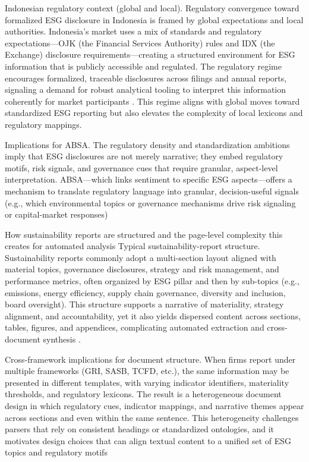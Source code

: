 Indonesian regulatory context (global and local). Regulatory convergence toward formalized ESG disclosure in Indonesia is framed by global expectations and local authorities. Indonesia’s market uses a mix of standards and regulatory expectations—OJK (the Financial Services Authority) rules and IDX (the Exchange) disclosure requirements—creating a structured environment for ESG information that is publicly accessible and regulated. The regulatory regime encourages formalized, traceable disclosures across filings and annual reports, signaling a demand for robust analytical tooling to interpret this information coherently for market participants \cite{10.22617/tcs210472-2,10.1108/mf-01-2023-0020,10.1007/s40804-021-00233-z} . This regime aligns with global moves toward standardized ESG reporting but also elevates the complexity of local lexicons and regulatory mappings.

Implications for ABSA. The regulatory density and standardization ambitions imply that ESG disclosures are not merely narrative; they embed regulatory motifs, risk signals, and governance cues that require granular, aspect-level interpretation. ABSA—which links sentiment to specific ESG aspects—offers a mechanism to translate regulatory language into granular, decision-useful signals (e.g., which environmental topics or governance mechanisms drive risk signaling or capital-market responses) \cite{10.1002/csr.70089,10.69593/ajbais.v4i04.130,10.1108/mf-01-2023-0020,10.1007/s40804-021-00233-z,10.1111/eufm.12509}

How sustainability reports are structured and the page-level complexity this creates for automated analysis
Typical sustainability-report structure. Sustainability reports commonly adopt a multi-section layout aligned with material topics, governance disclosures, strategy and risk management, and performance metrics, often organized by ESG pillar and then by sub-topics (e.g., emissions, energy efficiency, supply chain governance, diversity and inclusion, board oversight). This structure supports a narrative of materiality, strategy alignment, and accountability, yet it also yields dispersed content across sections, tables, figures, and appendices, complicating automated extraction and cross-document synthesis \cite{10.1111/jacf.12411,10.1111/1911-3838.12232,10.1111/ablj.12210} .

Cross-framework implications for document structure. When firms report under multiple frameworks (GRI, SASB, TCFD, etc.), the same information may be presented in different templates, with varying indicator identifiers, materiality thresholds, and regulatory lexicons. The result is a heterogeneous document design in which regulatory cues, indicator mappings, and narrative themes appear across sections and even within the same sentence. This heterogeneity challenges parsers that rely on consistent headings or standardized ontologies, and it motivates design choices that can align textual content to a unified set of ESG topics and regulatory motifs \cite{10.1108/medar-11-2020-1097,10.20900/jsr20210006,10.31436/iiumlj.v30is2.755,10.1787/a9889ba3-en}

